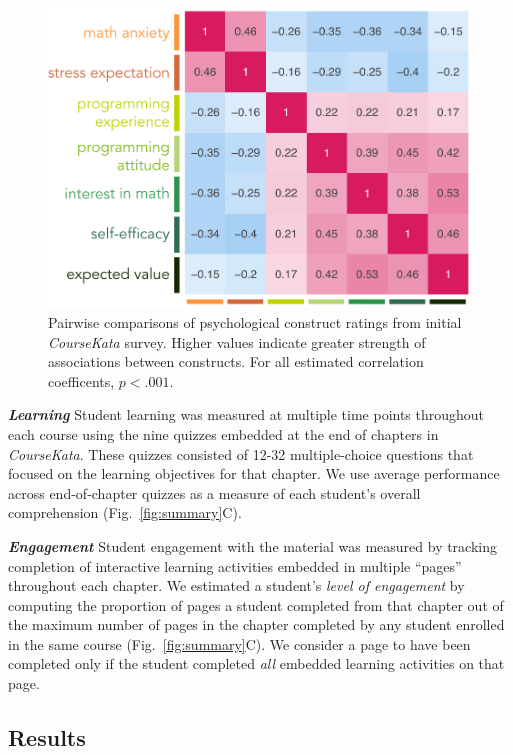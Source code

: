 \documentclass[10pt,letterpaper]{article}
\newcommand{\ck}{\textit{CourseKata}}
\begin{document}
\begin{figure}[ht!]
\begin{center}
\includegraphics[width=0.9\linewidth]{figures_cogsci/observational_correlation_constructs.pdf}
\end{center}
 \caption{Pairwise comparisons of psychological construct ratings from initial \ck{} survey. Higher values indicate greater strength of associations between constructs. For all estimated correlation coefficents, $p< .001$.} 
\label{fig:coursekata_construct_clusters}
\end{figure}

\noindent \textbf{\textit{Learning}}
Student learning was measured at multiple time points throughout each course using the nine quizzes embedded at the end of chapters in \ck. 
These quizzes consisted of 12-32 multiple-choice questions that focused on the learning objectives for that chapter. 
We use average performance across end-of-chapter quizzes as a measure of each student's overall comprehension (Fig.~\ref{fig:summary}C).

\noindent \textbf{\textit{Engagement}}
Student engagement with the material was measured by tracking completion of interactive learning activities embedded in multiple ``pages'' throughout each chapter.
We estimated a student's \textit{level of engagement} by computing the proportion of pages a student completed from that chapter out of the maximum number of pages in the chapter completed by any student enrolled in the same course (Fig.~\ref{fig:summary}C).  
We consider a page to have been completed only if the student completed \textit{all} embedded learning activities on that page. 


\subsection{Results}
\end{document}
